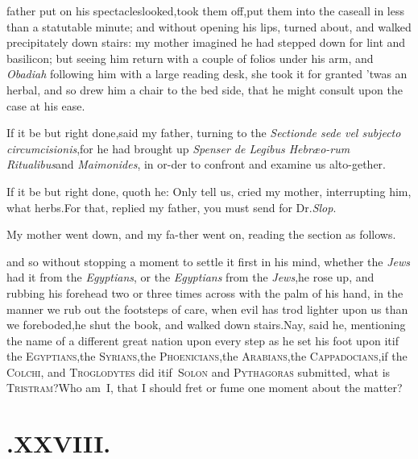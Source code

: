 \documentclass{article}
\begin{document}
 father put on his
spectacles\tsk looked,\tsk took them off,\tsk put them into
the case\tsk all in less than a statutable minute; and without
opening his lips, turned about, and walked precipitately down
stairs: my mother imagined he had stepped down for lint and
basilicon; but seeing him return with a couple of folios under his
arm, and \textit{Obadiah} following him with a large reading
desk,
she took it for granted ’twas an herbal, and so drew him a
chair to the bed side, that he might consult upon the case at his
ease.

\tsk If it be but right done,\tsk said my father, turning to the
\textit{Section\tsk de sede vel subjecto circumcisionis},\tsk for he had
brought up \textit{Spenser de Legibus
Hebræo-\break rum Ritualibus}\tsk and
\textit{Maimonides}, in or-\break der to confront and examine us alto-\break gether.\tsk

\tsh If it be but right done, quoth he:\break
\tsk Only tell
us, cried my mother, inter\-rupting him, what herbs.\tsk For that,\break
replied my father, you must send for\break 
Dr.\@ \textit{Slop}.

My mother went down, and my fa-\break ther went on, reading the section
as\break
follows.

\noindent
\stick{\indent \astfill}\break
\stick{\astfill}
\stick{\astfill}
\stick{\astfill}
\break
\tsh and so without stopping a moment to settle\enlargethispage{2\baselineskip}
it first in his mind, whether the \textit{Jews} had it from the
\textit{Egyptians}, or the \textit{Egyptians} from the
\textit{Jews},\tsk he rose up, and rubbing his forehead two or
three times across with the palm of his hand, in the
manner we rub out the footsteps of care, when evil has trod lighter
upon us than we foreboded,\tsk he shut the book, and walked down
stairs.\tsk Nay, said he, mentioning the name of a different
great nation upon every step as he set his foot upon it\tsk if
the \textsc{Egyptians},\tsk the
\textsc{Sy\-rians},\tsk the
\textsc{Phoenicians},\tsk the
\textsc{Ara\-bians},\tsk the
\textsc{Cappadocians},\tsh if the
\textsc{Colchi}, and \textsc{Troglodytes} did
it\tsh if~\textsc{Solon} and
\textsc{Pythagoras} submitted,\break
\tsk what is \textsc{Tristram}?\tsh Who am~I, that I should fret
or fume one moment\break
about the matter?

\section{.\enspace  XXVIII.}
\end{document}
